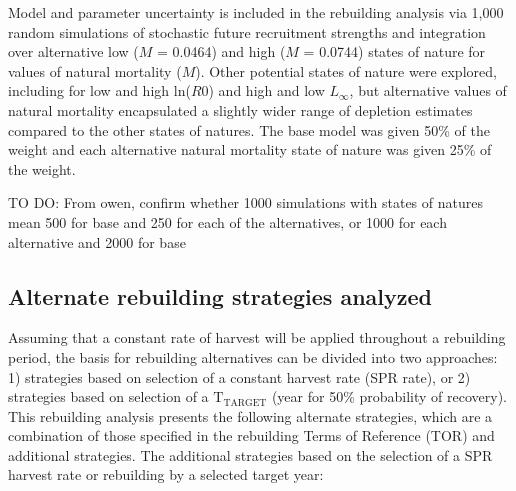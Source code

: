 \documentclass[11pt,
  english,
  a4paper,
]{article}
\begin{document}
\leavevmode\tagmcend\tagstructend


Model and parameter uncertainty is included in the rebuilding analysis via 1,000 random simulations of stochastic future recruitment strengths and integration over alternative low ({\(M\)\leavevmode\tagmcend\tagstructend} = 0.0464) and high ({\(M\)\leavevmode\tagmcend\tagstructend} = 0.0744) states of nature for values of natural mortality ({\(M\)\leavevmode\tagmcend\tagstructend}). Other potential states of nature were explored, including for low and high ln({\(R0\)\leavevmode\tagmcend\tagstructend}) and high and low {\(L_{\infty}\)\leavevmode\tagmcend\tagstructend}, but alternative values of natural mortality encapsulated a slightly wider range of depletion estimates compared to the other states of natures. The base model was given 50\% of the weight and each alternative natural mortality state of nature was given 25\% of the weight.

\leavevmode\tagmcend\tagstructend\par


TO DO: From owen, confirm whether 1000 simulations with states of natures mean 500 for base and 250 for each of the alternatives, or 1000 for each alternative and 2000 for base

\leavevmode\tagmcend\tagstructend\par


\hypertarget{alternate-rebuilding-strategies-analyzed}{%
\subsection{Alternate rebuilding strategies analyzed}\label{alternate-rebuilding-strategies-analyzed}}

\leavevmode\tagmcend\tagstructend


Assuming that a constant rate of harvest will be applied throughout a rebuilding period, the basis for rebuilding alternatives can be divided into two approaches: 1) strategies based on selection of a constant harvest rate (SPR rate), or 2) strategies based on selection of a {\(\text{T}_\text{TARGET}\)\leavevmode\tagmcend\tagstructend} (year for 50\% probability of recovery). This rebuilding analysis presents the following alternate strategies, which are a combination of those specified in the rebuilding Terms of Reference (TOR) and additional strategies. The additional strategies based on the selection of a SPR harvest rate or rebuilding by a selected target year:
\end{document}

